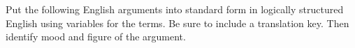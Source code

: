 \begin{exercises}
   
         
\end{exercises} 

\noindent\problempart Put the following English arguments into standard form in logically structured English using variables for the terms. Be sure to include a translation key. Then identify mood and figure of the argument.
 

